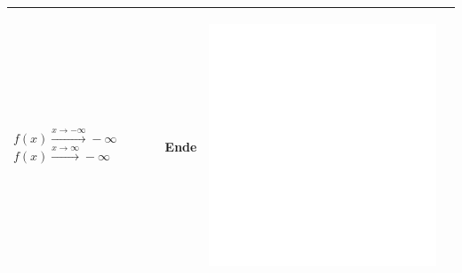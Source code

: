\documentclass[oneside,openany,headings=optiontotoc,11pt,numbers=noenddot]{scrreprt}
\begin{document}
\begin{table}
\begin{tabular}{|M{4.35cm}|M{4.35cm}||M{4.35cm}|M{4.25cm}|}
			\hline
			 & Ende & \begin{center}
				\includegraphics[scale=0.15]{../empty.jpg}
			\end{center}& \\
			\hline
		\end{tabular}
	\end{table}
\end{document}
